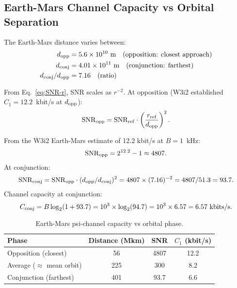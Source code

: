 \documentclass[aps,prd,twocolumn,superscriptaddress,nofootinbib]{revtex4-2}
\newcommand{\SNR}{\mathrm{SNR}}
\begin{document}
\subsection{Earth-Mars Channel Capacity vs Orbital Separation}

The Earth-Mars distance varies between:
\begin{align}
d_{\rm opp} &= 5.6\times 10^{10}~\text{m} \quad (\text{opposition: closest approach}) \\
d_{\rm conj} &= 4.01\times 10^{11}~\text{m} \quad (\text{conjunction: farthest}) \\
d_{\rm conj}/d_{\rm opp} &= 7.16 \quad (\text{ratio})
\end{align}

From Eq.~\eqref{eq:SNR-r}, SNR scales as $r^{-2}$.
At opposition (W3i2 established $C_1 = 12.2$~kbit/s at $d_{\rm opp}$):
\begin{equation}
\SNR_{\rm opp} = \SNR_{\rm ref} \cdot \left(\frac{r_{\rm ref}}{d_{\rm opp}}\right)^2.
\end{equation}

From the W3i2 Earth-Mars estimate of 12.2 kbit/s at $B = 1$~kHz:
\begin{equation}
\SNR_{\rm opp} = 2^{12.2} - 1 \approx 4807.
\end{equation}
At conjunction:
\begin{equation}
\SNR_{\rm conj} = \SNR_{\rm opp} \cdot (d_{\rm opp}/d_{\rm conj})^2
= 4807 \times (7.16)^{-2} = 4807 / 51.3 = 93.7.
\end{equation}
Channel capacity at conjunction:
\begin{equation}
C_{\rm conj} = B\log_2(1 + 93.7) = 10^3 \times \log_2(94.7)
= 10^3 \times 6.57 = 6.57~\text{kbits/s}.
\end{equation}

\begin{table}[h]
\centering
\caption{Earth-Mars psi-channel capacity vs orbital phase.}
\begin{tabular}{lccc}
\hline\hline
Phase & Distance (Mkm) & SNR & $C_1$ (kbit/s) \\
\hline
Opposition (closest) & 56 & 4807 & 12.2 \\
Average ($\approx$ mean orbit) & 225 & 300 & 8.2 \\
Conjunction (farthest) & 401 & 93.7 & 6.6 \\
\hline
\hline
\end{tabular}
\label{tab:earth-mars}
\end{table}
\end{document}
